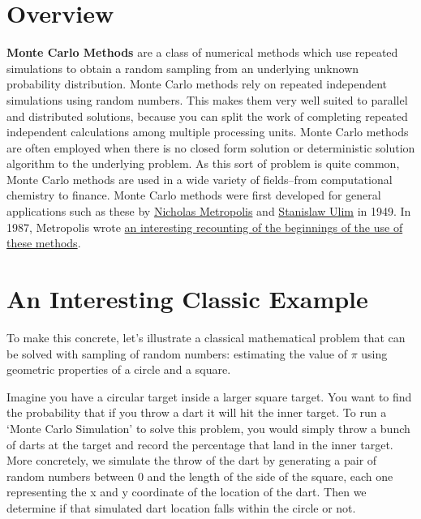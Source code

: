 \documentclass[letterpaper,10pt,openany,oneside]{sphinxmanual}
\begin{document}
\section{Overview}
\label{Introduction/Introduction:overview}
\textbf{Monte Carlo Methods} are a class of numerical methods which use repeated
simulations to obtain a random sampling from an underlying unknown probability
distribution.  Monte Carlo methods rely on repeated independent
simulations using random numbers. This makes them very well suited to parallel and
distributed solutions, because you can split the work of completing repeated independent
calculations among multiple processing units. Monte Carlo
methods are often employed when there is no closed form solution or
deterministic solution algorithm to the underlying problem. As this sort of
problem is quite common, Monte Carlo methods are used in a wide variety of
fields--from computational chemistry to finance.  Monte Carlo methods were first
developed for general applications such as these by
\href{http://scienceworld.wolfram.com/biography/Metropolis.html}{Nicholas Metropolis}
and \href{http://scienceworld.wolfram.com/biography/Ulam.html}{Stanislaw Ulim}
in 1949. In 1987, Metropolis wrote \href{http://library.lanl.gov/cgi-bin/getfile?00326866.pdf}{an interesting recounting of the beginnings of the use
of these methods}.


\section{An Interesting Classic Example}
\label{Introduction/Introduction:an-interesting-classic-example}
To make this concrete, let's illustrate a classical mathematical problem that can be
solved with sampling of random numbers: estimating the value of $\pi$ using
geometric properties of a circle and a square.

Imagine you have a circular target inside a larger square
target. You want to find the probability that if you throw a dart it will
hit the inner target. To run a `Monte Carlo Simulation' to solve this problem,
you would simply throw a bunch of darts at the target and record the percentage
that land in the inner target. More concretely, we simulate the throw of the dart
by generating a pair of random numbers between 0 and the length of the side of the
square, each one representing the x and y coordinate of the location of the dart.
Then we determine if that simulated dart location falls within the circle or not.
\end{document}
